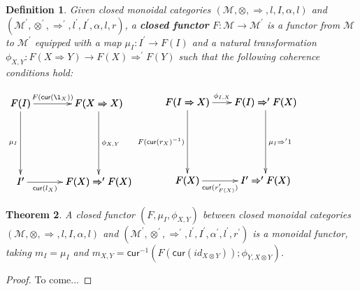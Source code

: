 \documentclass{article}
\newtheorem{theorem}{Theorem}
\newtheorem{definition}[theorem]{Definition}
\let\mto\to
\let\to\relax
\newcommand{\to}{\rightarrow}
\newcommand{\cat}[1]{\mathcal{#1}}
\newcommand{\cur}[1]{\mathsf{cur}(#1)}
\newcommand{\curi}[1]{\mathsf{cur}^{-1}(#1)}
\begin{document}
\begin{definition} Given closed monoidal categories $(\cat{M}, \otimes, \Rightarrow, l, I, \alpha, l)$ and $(\cat{M}^\prime, \otimes^\prime, \Rightarrow^\prime, l^\prime, I^\prime, \alpha, l, r)$, a \textbf{closed functor} $F : \cat{M} \mto \cat{M}^\prime$ is a functor from $\cat{M}$ to $\cat{M}^\prime$ equipped with a map $\mu_I : I^\prime \mto F(I)$ and a natural transformation $\phi_{X,Y} : F(X \Rightarrow Y) \mto F(X) \Rightarrow^\prime F(Y)$ such that the following coherence conditions hold:

  \begin{center}
    \begin{math}
      \bfig
      \square(0,0)<800,800>[F(I)`F(X \Rightarrow X)`I^\prime`F(X) \Rightarrow^\prime F(X);F(\cur{\l_X})`\mu_I`\phi_{X,Y}`\cur{l_X}]
      \efig
      \bfig
      \square(0,0)<800,800>[F(I \Rightarrow X)`F(I) \Rightarrow^\prime F(X)`F(X)`I^\prime \Rightarrow^\prime F(X); \phi_{I,X} ` F(\cur{r_X}^{-1}) ` \mu_I \Rightarrow^\prime 1 `\cur{r_{F(X)}^{\prime}}]
      \efig
    \end{math}
  \end{center}
  
  
\end{definition}
\vspace{-15px}

\begin{theorem} A closed functor $(F, \mu_I, \phi_{X,Y})$ between closed monoidal categories $(\cat{M}, \otimes, \Rightarrow, l, I, \alpha, l)$
  and $(\cat{M}^\prime, \otimes^\prime, \Rightarrow^\prime, l^\prime, I^\prime, \alpha^\prime, l^\prime, r^\prime)$ is a monoidal functor, taking $m_I = \mu_I$ and $m_{X,Y} = \curi{F(\cur{id_{X \otimes Y}});\phi_{Y, X \otimes Y}}$.
\end{theorem}
\begin{proof}
  To come...
\end{proof}

\nocite{*}


\end{document}
